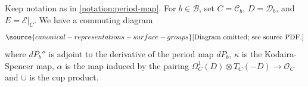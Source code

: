 \begin{proposition}
\notready
	\label{proposition:period-map}
	Keep notation as in \autoref{notation:period-map}.
	For $b \in \mathscr B$, set $C=\mathscr{C}_b$, $D=\mathscr{D}_b$, and $E=\mathscr{E}|_C$. We have a commuting diagram
	\begin{equation}
		\label{equation:period-to-cup}
\source{canonical-representations-surface-groups}
		\text{[Diagram omitted; see source PDF.]}\end{equation}
	where $dP_b''$ is adjoint to the derivative of the period map $dP_b$, $\kappa$ is the Kodaira-Spencer map, $\alpha$ is the map induced by the pairing
	$\Omega^1_{ C}( D) \otimes T_{ C}(- D) \to \mathscr O_{ C}$
	and $\cup$ is the cup product.
\end{proposition}

